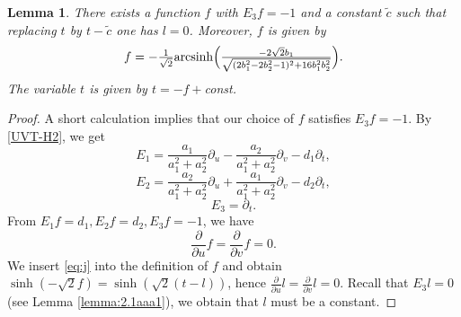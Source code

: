 \documentclass[reqno]{amsart}%
\newtheorem{lemma}[theorem]{Lemma}
\theoremstyle{definition}
\numberwithin{equation}{section}
\begin{document}
\begin{lemma}\label{lemma:2.1a3}
There exists a function $f$ with $E_3f=-1$ and a constant $\tilde{c}$ such that
replacing $t$ by $t-\tilde{c}$ one has $l=0$. Moreover, $f$ is given by
$$
f=-\tfrac{1}{\sqrt{2}}{\rm arcsinh}\Big(\tfrac{-2\sqrt{2}b_1}
{\sqrt{(2b_1^2-2b_2^2-1)^2+16b_1^2b_2^2}}\Big).
$$
The variable $t$ is given by $t=-f+$const.

\end{lemma}
%
\begin{proof}
A short calculation implies that our choice of $f$ satisfies $E_3f=-1$.
By \eqref{UVT-H2}, we get
%
\begin{equation}\label{eq:2.ab12}
E_1=\frac{a_1}{a_1^2+a_2^2}\partial_u-\frac{a_2}{a_1^2+a_2^2}\partial_v-d_1\partial_t,
\end{equation}
%
\begin{equation}\label{eq:2.ab13}
E_2=\frac{a_2}{a_1^2+a_2^2}\partial_u+\frac{a_1}{a_1^2+a_2^2}\partial_v-d_2\partial_t,
\end{equation}
%
\begin{equation}\label{eq:2.ab14}
E_3=\partial_t.
\end{equation}
From $E_1f=d_1, E_2f=d_2, E_3f=-1$, we have
$$
\frac{\partial}{\partial u}f=\frac{\partial}{\partial v}f=0.
$$
We insert \eqref{eq:j} into the definition of $f$ and obtain $\sinh(-\sqrt{2}f)=\sinh(\sqrt{2}(t-l))$,
hence $\frac{\partial}{\partial u}l=\frac{\partial}{\partial v}l=0$.
Recall that $E_3l=0$ (see Lemma \ref{lemma:2.1aaa1}), we obtain that $l$ must be a constant.
\end{proof}
\end{document}
